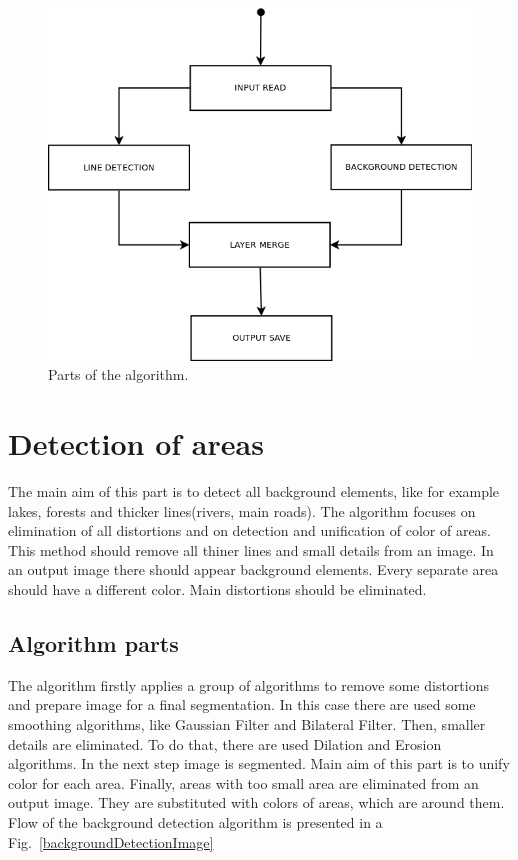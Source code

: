 \documentclass[a4paper,onecolumn,oneside,12pt]{memoir}
\begin{document}
\begin{figure}[!ht]
\begin{center}
\includegraphics[scale=0.5]{images/allAlgorithmParts.png}
\caption{Parts of the algorithm.}
\label{algorithmParts}
\end{center}
\end{figure}

\section{Detection of areas}

The main aim of this part is to detect all background elements, like for example lakes, forests and
thicker lines(rivers, main roads). The algorithm focuses on elimination of all distortions and
on detection and unification of color of areas. This method should remove all thiner lines and small
details from an image. In an output image there should appear background elements. Every separate
area should have a different color. Main distortions should be eliminated.

\subsection{Algorithm parts}

The algorithm firstly applies a group of algorithms to remove some distortions and prepare image for
a final segmentation. In this case there are used some smoothing algorithms, like Gaussian Filter
and Bilateral Filter. Then, smaller details are eliminated. To do that, there are used Dilation and
Erosion algorithms. In the next step image is segmented. Main aim of this part is to unify color for
each area. Finally, areas with too small area are eliminated from an output image. They are
substituted with colors of areas, which are around them. Flow of the background detection algorithm
is presented in a Fig.~\ref{backgroundDetectionImage}
\end{document}
